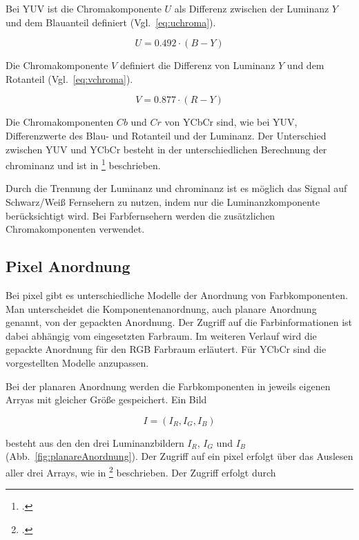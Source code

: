 Bei YUV ist die Chromakomponente $U$ als Differenz zwischen der Luminanz $Y$ und dem Blauanteil definiert (Vgl.~\ref{eq:uchroma}).

\begin{equation}
	U = 0.492 \cdot \left(B-Y\right)
	\label{eq:uchroma}
\end{equation}

Die Chromakomponente $V$ definiert die Differenz von Luminanz $Y$ und dem Rotanteil (Vgl.~\ref{eq:vchroma}).

\begin{equation}
	V = 0.877 \cdot \left(R-Y\right)
	\label{eq:vchroma}
\end{equation}

Die Chromakomponenten $Cb$ und $Cr$ von YCbCr sind, wie bei YUV, Differenzwerte des Blau- und Rotanteil und der Luminanz. Der Unterschied zwischen YUV und YCbCr besteht in der unterschiedlichen Berechnung der \gls{chrominanz} und ist in \citeauthor{burger05}\footcite[][S.265--266]{burger05} beschrieben.

Durch die Trennung der Luminanz und \gls{chrominanz} ist es möglich das Signal auf Schwarz/Weiß Fernsehern zu nutzen, indem nur die Luminanzkomponente berücksichtigt wird. Bei Farbfernsehern werden die zusätzlichen Chromakomponenten verwendet.


\subsection{Pixel Anordnung} %
\label{sub:pixelanordnung}
Bei \gls{pixel} gibt es unterschiedliche Modelle der Anordnung von Farbkomponenten. Man unterscheidet die Komponentenanordnung, auch planare Anordnung genannt, von der gepackten Anordnung. Der Zugriff auf die Farbinformationen ist dabei abhängig vom eingesetzten Farbraum. Im weiteren Verlauf wird die gepackte Anordnung für den RGB Farbraum erläutert. Für YCbCr sind die vorgestellten Modelle anzupassen.

Bei der planaren Anordnung werden die Farbkomponenten in jeweils eigenen Arryas mit gleicher Größe gespeichert. Ein Bild

\begin{equation}
	I = \left(I_R, I_G, I_B\right)
	\label{eq:planarImage}
\end{equation}

besteht aus den den drei Luminanzbildern $I_R$, $I_G$ und $I_B$ (Abb.~\ref{fig:planareAnordnung}). Der Zugriff auf ein \gls{pixel} erfolgt über das Auslesen aller drei Arrays, wie in \citeauthor{burger05}\footcite[Vgl.][S.~235--236]{burger05} beschrieben. Der Zugriff erfolgt durch

